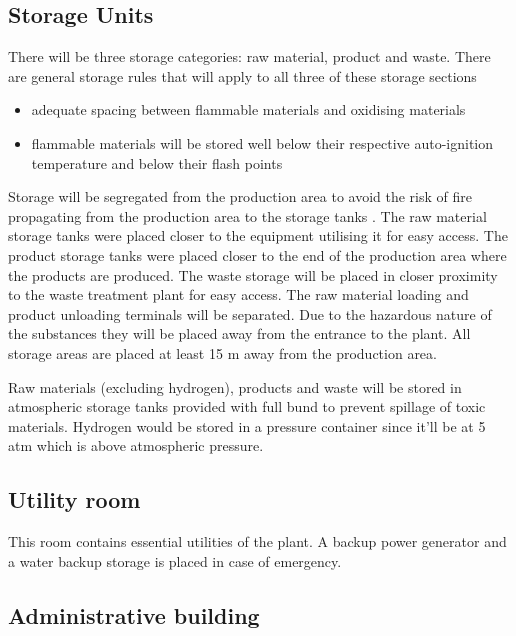 \subsection{Storage Units}

There will be three storage categories: raw material, product and waste. There are general storage rules that will apply to all three of these storage sections 

\begin{itemize}
    \item adequate spacing between flammable materials and oxidising materials 
    \item flammable materials will be stored well below their respective auto-ignition temperature and below their flash points
\end{itemize}

Storage will be segregated from the production area to avoid the risk of fire propagating from the production area to the storage tanks \cite{mannan_lees_2012}. The raw material storage tanks were placed closer to the equipment utilising it for easy access. The product storage tanks were placed closer to the end of the production area where the products are produced. The waste storage will be placed in closer proximity to the waste treatment plant for easy access. The raw material loading and product unloading terminals will be separated. Due to the hazardous nature of the substances they will be placed away from the entrance to the plant. All storage areas are placed at least 15 m away from the production area. 

Raw materials (excluding hydrogen), products and waste will be stored in atmospheric storage tanks provided with full bund to prevent spillage of toxic materials. Hydrogen would be stored in a pressure container since it'll be at 5 atm which is above atmospheric pressure.


\subsection{Utility room}
This room contains essential utilities of the plant. A backup power generator and a water backup storage is placed in case of emergency. 


\subsection{Administrative building}

